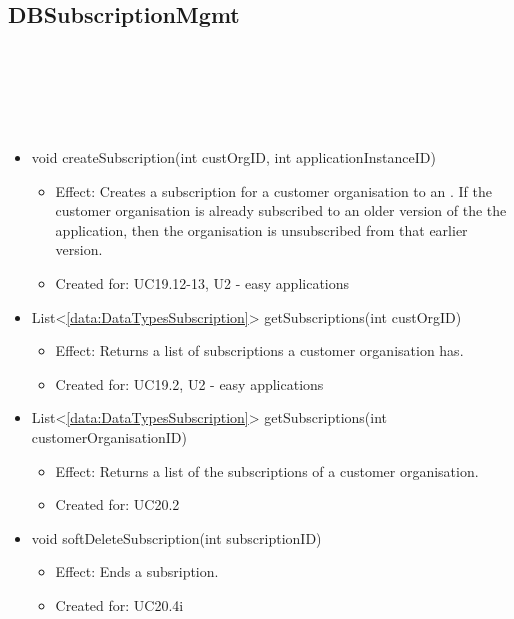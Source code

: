   \subsection{DBSubscriptionMgmt}\label{int:OtherDataDatabaseOtherDataDBDBSubscriptionMgmt}
    \begin{description}
      \item[Provided by:] \iconcomponent{}~
      \item[Required by:] \iconcomponent{}~
      \item[Operations:] ~
    \begin{itemize}[noitemsep,nolistsep,leftmargin=-.25cm]
      \item \textsf{void createSubscription(int custOrgID, int applicationInstanceID)}
        \begin{itemize}[noitemsep,nolistsep]
           \item Effect: Creates a subscription for a customer organisation to an . If the customer organisation is already subscribed to an older version of the the application, then the organisation is unsubscribed from that earlier version.
\item Created for: UC19.12-13, U2 - easy applications
        \end{itemize}
      \item \textsf{List\textless{}\ref{data:DataTypesSubscription}\textgreater{} getSubscriptions(int custOrgID)}
        \begin{itemize}[noitemsep,nolistsep]
           \item Effect: Returns a list of subscriptions a customer organisation has.
\item Created for: UC19.2, U2 - easy applications
        \end{itemize}
      \item \textsf{List\textless{}\ref{data:DataTypesSubscription}\textgreater{} getSubscriptions(int customerOrganisationID)}
        \begin{itemize}[noitemsep,nolistsep]
           \item Effect: Returns a list of the subscriptions of a customer organisation.
\item Created for: UC20.2
        \end{itemize}
      \item \textsf{void softDeleteSubscription(int subscriptionID)}
        \begin{itemize}[noitemsep,nolistsep]
           \item Effect: Ends a subsription.
\item Created for: UC20.4i
        \end{itemize}
    \end{itemize}
    \end{description}

